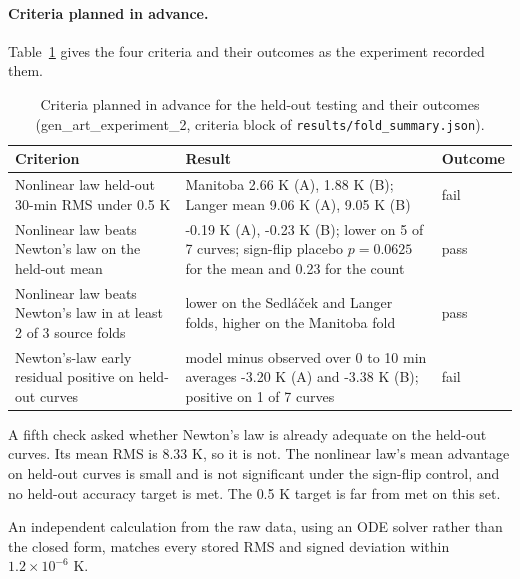 \documentclass[11pt,letterpaper]{article}
\begin{document}
\paragraph{Criteria planned in advance.} Table~\ref{tab:it2-criteria} gives the four criteria and their outcomes as the experiment recorded them.

\begin{table}[!htbp]
\centering
\small
\caption{Criteria planned in advance for the held-out testing and their outcomes (gen\_art\_experiment\_2, criteria block of \texttt{results/fold\_summary.json}).}
\label{tab:it2-criteria}
\begin{tabularx}{\linewidth}{p{5.0cm}X p{1.6cm}}
\toprule
Criterion & Result & Outcome \\
\midrule
Nonlinear law held-out 30-min RMS under 0.5 K & Manitoba 2.66 K (A), 1.88 K (B); Langer mean 9.06 K (A), 9.05 K (B) & fail \\
Nonlinear law beats Newton's law on the held-out mean & -0.19 K (A), -0.23 K (B); lower on 5 of 7 curves; sign-flip placebo $p = 0.0625$ for the mean and 0.23 for the count & pass \\
Nonlinear law beats Newton's law in at least 2 of 3 source folds & lower on the Sedl\'{a}\v{c}ek and Langer folds, higher on the Manitoba fold & pass \\
Newton's-law early residual positive on held-out curves & model minus observed over 0 to 10 min averages -3.20 K (A) and -3.38 K (B); positive on 1 of 7 curves & fail \\
\bottomrule
\end{tabularx}
\end{table}

A fifth check asked whether Newton's law is already adequate on the held-out curves. Its mean RMS is 8.33 K, so it is not. The nonlinear law's mean advantage on held-out curves is small and is not significant under the sign-flip control, and no held-out accuracy target is met. The 0.5 K target is far from met on this set.

An independent calculation from the raw data, using an ODE solver rather than the closed form, matches every stored RMS and signed deviation within $1.2 \times 10^{-6}$ K.
\end{document}
